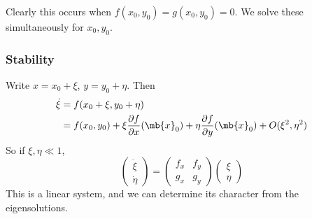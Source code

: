 \documentclass[a4paper]{article}
\begin{document}
Clearly this occurs when $f(x_0, y_0) = g(x_0, y_0) = 0$. We solve these simultaneously for $x_0, y_0$.

\subsubsection{Stability}
Write $x = x_0 + \xi$, $y = y_0 + \eta$. Then
\begin{align*}
  \dot \xi &= f(x_0 + \xi, y_0 + \eta)\\
  &= f(x_0, y_0)+ \xi \frac{\partial f}{\partial x}(\mb{x}_0) + \eta \frac{\partial f}{\partial y}(\mb{x}_0) + O(\xi^2, \eta^2)
\end{align*}
So if $\xi, \eta \ll 1$, 
\[
\begin{pmatrix}
  \dot \xi\\\dot \eta
\end{pmatrix} = 
\begin{pmatrix}
  f_x & f_y\\
  g_x & g_y
\end{pmatrix}
\begin{pmatrix}
  \xi\\\eta
\end{pmatrix}
\]
This is a linear system, and we can determine its character from the eigensolutions. 
\end{document}
